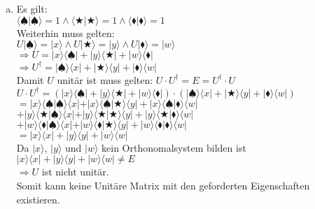 \documentclass[a4paper]{scrartcl}
\begin{document}
\begin{enumerate}[a)]
\item 
Es gilt:\\
$\langle \spadesuit | \spadesuit\rangle =1 \wedge \langle \bigstar | \bigstar \rangle=1 \wedge \langle \blacklozenge | \blacklozenge\rangle =1$\\
Weiterhin muss gelten:\\
$U|\spadesuit\rangle=|x\rangle \wedge U|\bigstar\rangle=|y\rangle \wedge U|\blacklozenge\rangle=|w\rangle$\\
$\Rightarrow U=|x\rangle\langle\spadesuit|+|y\rangle\langle\bigstar|+|w\rangle\langle\blacklozenge|$\\
$\Rightarrow U^\dagger= |\spadesuit\rangle\langle x|+|\bigstar\rangle\langle y|+|\blacklozenge\rangle\langle w|$\\
Damit $U$ unitär ist muss gelten: $U\cdot U^\dagger=E=U^\dagger\cdot U$\\
$U\cdot U^\dagger = (|x\rangle\langle\spadesuit|+|y\rangle\langle\bigstar|+|w\rangle\langle\blacklozenge|)\cdot(|\spadesuit\rangle\langle x|+|\bigstar\rangle\langle y|+|\blacklozenge\rangle\langle w|)$\\
$= |x\rangle\langle\spadesuit|\spadesuit\rangle\langle x|+|x\rangle\langle\spadesuit|\bigstar\rangle\langle y|+|x\rangle\langle\spadesuit|\blacklozenge\rangle\langle w|$\\
$+|y\rangle\langle\bigstar|\spadesuit\rangle\langle x|+|y\rangle\langle\bigstar|\bigstar\rangle\langle y|+|y\rangle\langle\bigstar|\blacklozenge\rangle\langle w|$\\
$+|w\rangle\langle\blacklozenge|\spadesuit\rangle\langle x|+|w\rangle\langle\blacklozenge|\bigstar\rangle\langle y|+|w\rangle\langle\blacklozenge|\blacklozenge\rangle\langle w|$\\
$= |x\rangle\langle x|+|y\rangle\langle y|+|w\rangle\langle w|$\\
Da $|x\rangle$, $|y\rangle$ und $|w\rangle$ kein Orthonomalsystem bilden ist $|x\rangle\langle x|+|y\rangle\langle y|+|w\rangle\langle w|\neq E$\\
$\Rightarrow U$ ist nicht unitär.\\
Somit kann keine Unitäre Matrix mit den geforderten Eigenschaften existieren.


\end{enumerate}
\end{document}
